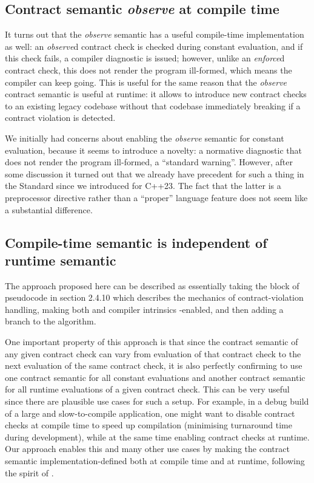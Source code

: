 \subsection{Contract semantic \emph{observe} at compile time}

It turns out that the \emph{observe} semantic has a useful compile-time implementation as well: an \emph{observe}d contract check is checked during constant evaluation, and if this check fails, a compiler diagnostic is issued; however, unlike an \emph{enforce}d contract check, this does not render the program ill-formed, which means the compiler can keep going. This is useful for the same reason that the \emph{observe} contract semantic is useful at runtime: it allows to introduce new contract checks to an existing legacy codebase without that codebase immediately breaking if a contract violation is detected.

We initially had concerns about enabling the \emph{observe} semantic for constant evaluation, because it seems to introduce a novelty: a normative diagnostic that does not render the program ill-formed, a ``standard warning''. However, after some discussion it turned out that we already have precedent for such a thing in the Standard since we introduced  \cite{P2437R1} for C++23. The fact that the latter is a preprocessor directive rather than a ``proper'' language feature does not seem like a substantial difference.

\subsection{Compile-time semantic is independent of runtime semantic}

The approach proposed here can be described as essentially taking the block of pseudocode in \cite{P2900R1} section 2.4.10 which describes the mechanics of contract-violation handling, making both  and  compiler intrinsics -enabled, and then adding a  branch to the algorithm.

One important property of this approach is that since the contract semantic of any given contract check can vary from evaluation of that contract check to the next evaluation of the same contract check, it is also perfectly confirming to use one contract semantic for all constant evaluations and another contract semantic for all runtime evaluations of a given contract check. This can be very useful since there are plausible use cases for such a setup. For example, in a debug build of a large and slow-to-compile application, one might want to disable contract checks at compile time to speed up compilation (minimising turnaround time during development), while at the same time enabling contract checks at runtime. Our approach enables this and many other use cases by making the contract semantic implementation-defined both at compile time and at runtime, following the spirit of \cite{P2877R0}.

